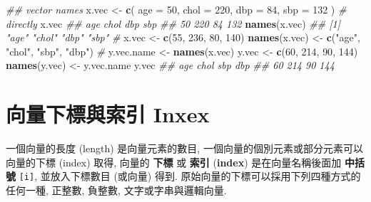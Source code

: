 \documentclass[
]{book}
\newenvironment{Shaded}{\begin{snugshade}}{\end{snugshade}}
\newcommand{\CommentTok}[1]{\textcolor[rgb]{0.56,0.35,0.01}{\textit{#1}}}
\newcommand{\DataTypeTok}[1]{\textcolor[rgb]{0.13,0.29,0.53}{#1}}
\newcommand{\DecValTok}[1]{\textcolor[rgb]{0.00,0.00,0.81}{#1}}
\newcommand{\KeywordTok}[1]{\textcolor[rgb]{0.13,0.29,0.53}{\textbf{#1}}}
\newcommand{\NormalTok}[1]{#1}
\newcommand{\StringTok}[1]{\textcolor[rgb]{0.31,0.60,0.02}{#1}}
\begin{document}
\begin{Shaded}
\begin{Highlighting}[]
\CommentTok{\#\# vector names}
\NormalTok{x.vec \textless{}{-}}\StringTok{ }\KeywordTok{c}\NormalTok{(}
  \DataTypeTok{age =} \DecValTok{50}\NormalTok{,}
  \DataTypeTok{chol =} \DecValTok{220}\NormalTok{,}
  \DataTypeTok{dbp =} \DecValTok{84}\NormalTok{,}
  \DataTypeTok{sbp =} \DecValTok{132}
\NormalTok{) }\CommentTok{\# directly}
\NormalTok{x.vec}
\CommentTok{\#\#  age chol  dbp  sbp }
\CommentTok{\#\#   50  220   84  132}
\KeywordTok{names}\NormalTok{(x.vec)}
\CommentTok{\#\# [1] "age"  "chol" "dbp"  "sbp"}
\CommentTok{\#}
\NormalTok{x.vec \textless{}{-}}\StringTok{ }\KeywordTok{c}\NormalTok{(}\DecValTok{55}\NormalTok{, }\DecValTok{236}\NormalTok{, }\DecValTok{80}\NormalTok{, }\DecValTok{140}\NormalTok{)}
\KeywordTok{names}\NormalTok{(x.vec) \textless{}{-}}\StringTok{ }\KeywordTok{c}\NormalTok{(}\StringTok{"age"}\NormalTok{, }\StringTok{"chol"}\NormalTok{, }\StringTok{"sbp"}\NormalTok{, }\StringTok{"dbp"}\NormalTok{)}
\CommentTok{\#}
\NormalTok{y.vec.name \textless{}{-}}\StringTok{ }\KeywordTok{names}\NormalTok{(x.vec)}
\NormalTok{y.vec \textless{}{-}}\StringTok{ }\KeywordTok{c}\NormalTok{(}\DecValTok{60}\NormalTok{, }\DecValTok{214}\NormalTok{, }\DecValTok{90}\NormalTok{, }\DecValTok{144}\NormalTok{)}
\KeywordTok{names}\NormalTok{(y.vec) \textless{}{-}}\StringTok{ }\NormalTok{y.vec.name}
\NormalTok{y.vec}
\CommentTok{\#\#  age chol  sbp  dbp }
\CommentTok{\#\#   60  214   90  144}
\end{Highlighting}
\end{Shaded}

\hypertarget{ux5411ux91cfux4e0bux6a19ux8207ux7d22ux5f15-inxex}{%
\section{向量下標與索引 Inxex}\label{ux5411ux91cfux4e0bux6a19ux8207ux7d22ux5f15-inxex}}

一個向量的長度 (length) 是向量元素的數目,
一個向量的個別元素或部分元素可以向量的下標 (index) 取得,
向量的
\textbf{下標}
或
\textbf{索引}
(\textbf{index})
是在向量名稱後面加 \textbf{中括號} \texttt{{[}i{]}},
並放入下標數目 (或向量) 得到.
原始向量的下標可以採用下列四種方式的任何一種,
正整數, 負整數, 文字或字串與邏輯向量.
\end{document}
